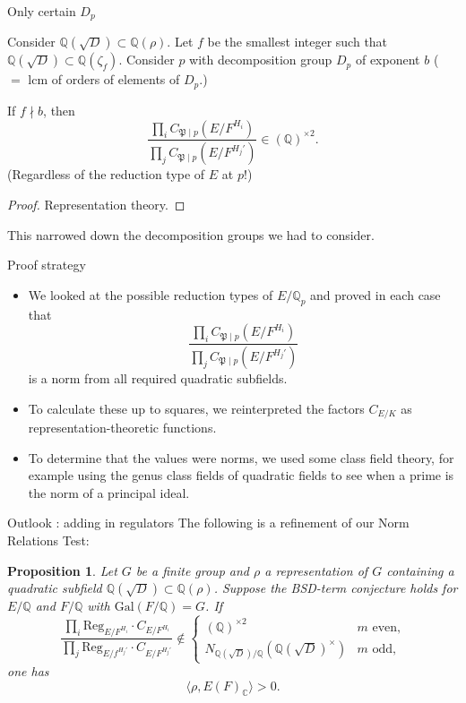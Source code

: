 \documentclass{beamer}
\newcommand{\Gal}{\mathrm{Gal}}
\newcommand{\Reg}{\mathrm{Reg}}
\newcommand{\bQ}{\mathbb{Q}}
\newcommand{\bC}{\mathbb{C}}
\newcommand{\fP}{\mathfrak{P}}
\theoremstyle{plain}
\newtheorem{proposition}[thm]{Proposition}
\begin{document}
\begin{frame}{Only certain $D_p$}
    \begin{lemma}
        Consider $\bQ(\sqrt{D}) \subset \bQ(\rho)$. Let $f$ be the smallest integer such that $\bQ(\sqrt{D}) \subset \bQ(\zeta_{f})$. \pause 
        Consider $p$ with decomposition group $D_p$ of exponent $b$ ( $=$ lcm of orders of elements of $D_p$.) \pause 

        If $f \nmid b$, then 
        $$\frac{\prod_i C_{\fP \mid p}(E / F^{H_i})}{\prod_j C_{\fP \mid p}(E / F^{H_j'})} \in (\bQ)^{\times 2}.$$\pause (Regardless of the reduction type of $E$ at $p$!)
    \end{lemma}\pause

    \begin{proof}
        Representation theory. \pause
    \end{proof}
    
    This narrowed down the decomposition groups we had to consider. 
\end{frame}

\begin{frame}{Proof strategy}
    \begin{itemize}
        \item We looked at the possible reduction types of $E / \bQ_p$ and proved in each case that 
    $$\frac{\prod_i C_{\fP \mid p}(E / F^{H_i})}{\prod_j C_{\fP \mid p}(E / F^{H_j'})}$$
    is a norm from all required quadratic subfields. \pause 
    \item 
    To calculate these up to squares, we reinterpreted the factors $C_{E / K}$ as representation-theoretic functions. \pause 
    \item
    To determine that the values were norms, we used some class field theory, for example using the genus class fields of quadratic fields to see when a prime is the norm of a principal ideal. 
    \end{itemize}
 \end{frame}

\begin{frame}{Outlook : adding in regulators}
The following is a refinement of our Norm Relations Test:

\begin{proposition}
    Let $G$ be a finite group and $\rho$ a representation of $G$ containing a quadratic subfield $\bQ(\sqrt{D}) \subset \bQ(\rho)$. \pause Suppose the BSD-term conjecture holds for $E / \bQ$ and $F / \bQ$ with $\Gal(F / \bQ) = G$. \pause If    \[ \frac{\prod_i \Reg_{E / F^{H_i}} \cdot C_{E/F^{H_i}}}{\prod_j \Reg_{E / f^{H_j'}} \cdot C_{E/F^{H_j'}}} \not\in
    \begin{cases}
        (\bQ)^{\times 2} & m \text{ even,}\\
        N_{\bQ(\sqrt{D}) / \bQ}(\bQ(\sqrt{D})^{\times}) & m \text{ odd,}
    \end{cases}\]  one has 
    \[ \langle \rho, E(F)_{\bC} \rangle > 0 .\] 
\end{proposition}
\end{frame}
\end{document}

